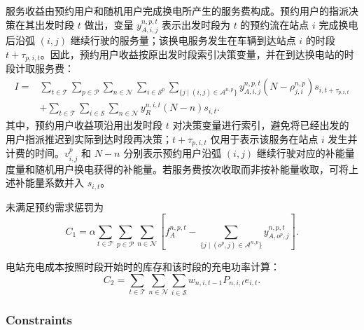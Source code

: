 \documentclass[12pt,hyperref,a4paper,UTF8]{ctexart}
\begin{document}
服务收益由预约用户和随机用户完成换电所产生的服务费构成。预约用户的指派决策在其出发时段 $t$ 做出，变量 $y_{A,i,j}^{n,p,t}$ 表示出发时段为 $t$ 的预约流在站点 $i$ 完成换电后沿弧 $(i,j)$ 继续行驶的服务量；该换电服务发生在车辆到达站点 $i$ 的时段 $t+\tau_{p,i,t}$。因此，预约用户收益按原出发时段索引决策变量，并在到达换电站的时段计取服务费：
\begin{equation}
\begin{aligned}
I=&
\sum_{t\in\mathcal{T}}
\sum_{p\in\mathcal{P}}
\sum_{n\in\mathcal{N}}
\sum_{i\in\mathcal{S}^{p}}
\sum_{\{j\mid (i,j)\in\mathcal{A}^{n,p}\}}
 y_{A,i,j}^{n,p,t}
 (N-\rho_{j,i}^{n,p})s_{i,t+\tau_{p,i,t}}
\\
&+
\sum_{t\in\mathcal{T}}\sum_{i\in\mathcal{S}}\sum_{n\in\mathcal{N}}
y_R^{n,i,t}(N-n)s_{i,t}.
\end{aligned}
\label{eq:income}
\end{equation}
其中，预约用户收益项沿用出发时段 $t$ 对决策变量进行索引，避免将已经出发的用户指派推迟到实际到达时段再决策；$t+\tau_{p,i,t}$ 仅用于表示该服务在站点 $i$ 发生并计费的时间。$v_{i,j}^{p}$ 和 $N-n$ 分别表示预约用户沿弧 $(i,j)$ 继续行驶对应的补能量度量和随机用户换电获得的补能量。若服务费按次收取而非按补能量收取，可将上述补能量系数并入 $s_{i,t}$。

未满足预约需求惩罚为
\begin{equation}
C_1 = \alpha \sum_{t\in \mathcal{T}} \sum_{p\in \mathcal{P}}  \sum_{n\in \mathcal{N}} 
\left[
f_A^{n,p,t} - \sum_{\{j \mid (o^p,j) \in \mathcal{A}^{n,p}\}} y_{A,o^p,j}^{n,p,t} \right].
\label{eq:penaltycost}
\end{equation}

电站充电成本按照时段开始时的库存和该时段的充电功率计算：
\begin{equation}
C_2 = \sum_{t \in \mathcal{T}}  \sum_{n \in \mathcal{N}} \sum_{i \in \mathcal{S}}
 w_{n,i,t-1}P_{n,i,t}e_{i,t}.
\label{eq:chargingcost}
\end{equation}

\subsubsection{Constraints}
\end{document}
